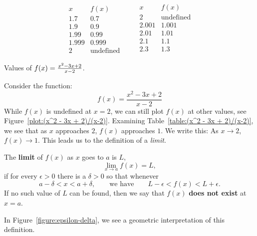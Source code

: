 \begin{margintable}[-1in]
\[
\begin{array}{c|c}
 x & f(x) \\ \hline
 1.7 &  0.7 \\
 1.9 &  0.9 \\
 1.99 &  0.99 \\
 1.999 &  0.999 \\
  2 &  \text{undefined}
\end{array}\qquad
\begin{array}{c|c}
 x & f(x) \\ \hline
  2 & \text{undefined}\\
 2.001&  1.001\\
 2.01&  1.01\\
 2.1 &  1.1 \\
 2.3 &  1.3 \\
\end{array}
\]
\caption{Values of $f(x)=\protect\frac{x^2 - 3x + 2}{x-2}$.}
\label{table:(x^2 - 3x + 2)/(x-2)}
\end{margintable}
Consider the function:
\[
f(x) = \frac{x^2 - 3x + 2}{x-2}
\]
While $f(x)$ is undefined at $x=2$, we can still plot $f(x)$ at other
values, see Figure~\ref{plot:(x^2 - 3x + 2)/(x-2)}. Examining
Table~\ref{table:(x^2 - 3x + 2)/(x-2)}, we see that as $x$ approaches
$2$, $f(x)$ approaches $1$. We write this: As $x \to 2$, $f(x) \to 1$.
This leads us to the definition of a \textit{limit}.



\begin{definition}\label{def:limit} 
The \textbf{limit} of $f(x)$ as $x$ goes to $a$ is $L$,
\[
\lim_{x\to a}f(x)=L,
\] 
if for every $\epsilon>0$ there is a $\delta > 0$ so that whenever 
\[
a- \delta < x < a+ \delta, \qquad\text{we have} \qquad L-\epsilon< f(x)<L+\epsilon.
\] 
If no such value of $L$ can be
found, then we say that $f(x)$ \textbf{does not exist} at $x=a$.
\end{definition}



In Figure~\ref{figure:epsilon-delta}, we see a geometric
interpretation of this definition.

